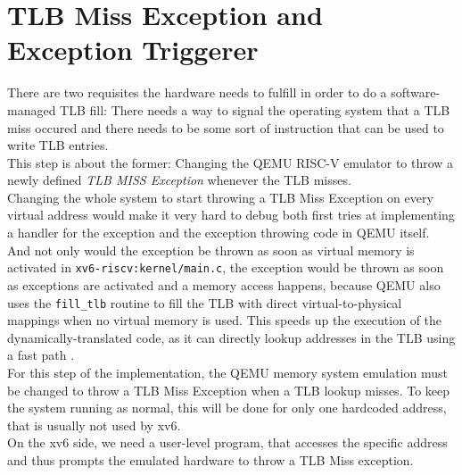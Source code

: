 \section{TLB Miss Exception and Exception Triggerer }
There are two requisites the hardware needs to fulfill in order to do a software-managed TLB fill:
There needs a way to signal the operating system that a TLB miss occured and there needs to be some
sort of instruction that can be used to write TLB entries.\\
This step is about the former: Changing the QEMU RISC-V emulator to throw a newly defined \textit{
    TLB MISS Exception} whenever the TLB misses.\\
Changing the whole system to start throwing a TLB Miss Exception on every virtual address would
make it very hard to debug both first tries at implementing a handler for the exception and the
exception throwing code in QEMU itself.\\
And not only would the exception be thrown as soon as virtual memory is activated in
\texttt{xv6-riscv:kernel/main.c}, the exception would be thrown
as soon as exceptions are activated and a memory access happens, because QEMU also uses the
\texttt{fill\_tlb} routine to fill the TLB with direct
virtual-to-physical mappings when no virtual memory is used. This speeds up the execution of
the dynamically-translated code, as it can directly
lookup addresses in the TLB using a fast path \cite{DeepDiveQEMU}.\\ 
For this step of the implementation, the QEMU memory system emulation must be changed to throw a
TLB Miss Exception when a TLB lookup misses. To keep the system running as normal, this will
be done for only one hardcoded address, that is usually not used by xv6.\\
On the xv6 side, we need a user-level program, that accesses the specific address and thus prompts
the emulated hardware to throw a TLB Miss exception.


